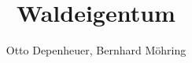 \documentclass{article}
\begin{document}
\begin{titlepage}
\author{Otto Depenheuer, Bernhard Möhring} 
\title{Waldeigentum} 
\maketitle
\newpage
\tableofcontents
\end{titlepage} 
\end{document}
